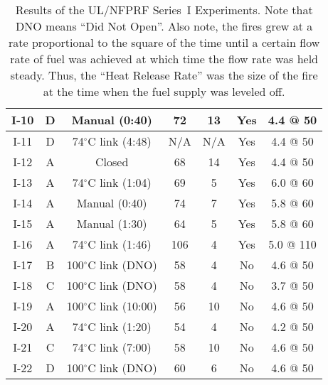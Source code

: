 \begin{table}[h!]
\begin{center}
\begin{tabular}{|c||c|c|c|c|c|c|}
I-10  & D  & Manual (0:40)              & 72            & 13        & Yes  & 4.4 @ 50  \\ \hline
I-11  & D  & 74$^\circ$C link (4:48)    & N/A           & N/A       & Yes  & 4.4 @ 50  \\ \hline
I-12  & A  & Closed                     & 68            & 14        & Yes  & 4.4 @ 50  \\ \hline
I-13  & A  & 74$^\circ$C link (1:04)    & 69            & 5         & Yes  & 6.0 @ 60  \\ \hline
I-14  & A  & Manual (0:40)              & 74            & 7         & Yes  & 5.8 @ 60  \\ \hline
I-15  & A  & Manual (1:30)              & 64            & 5         & Yes  & 5.8 @ 60  \\ \hline
I-16  & A  & 74$^\circ$C link (1:46)    & 106           & 4         & Yes  & 5.0 @ 110 \\ \hline \hline
I-17  & B  & 100$^\circ$C link (DNO)    & 58            & 4         & No   & 4.6 @ 50 \\ \hline
I-18  & C  & 100$^\circ$C link (DNO)    & 58            & 4         & No   & 3.7 @ 50 \\ \hline
I-19  & A  & 100$^\circ$C link (10:00)  & 56            & 10        & No   & 4.6 @ 50 \\ \hline
I-20  & A  & 74$^\circ$C link (1:20)    & 54            & 4         & No   & 4.2 @ 50 \\ \hline
I-21  & C  & 74$^\circ$C link (7:00)    & 58            & 10        & No   & 4.6 @ 50 \\ \hline
I-22  & D  & 100$^\circ$C link (DNO)    & 60            & 6         & No   & 4.6 @ 50 \\ \hline
\end{tabular}
\end{center}
\caption[Results of the UL/NFPRF Experiments, Series~I.]
{Results of the UL/NFPRF Series~I Experiments. Note that DNO means
``Did Not Open''. Also note, the fires grew at a rate proportional
to the square of the time until a certain flow rate of fuel was achieved
at which time the flow rate was held steady. Thus, the ``Heat Release Rate''
was the size of the fire at the time when the fuel supply was leveled off.}
\label{ULmatrix}
\end{table}

